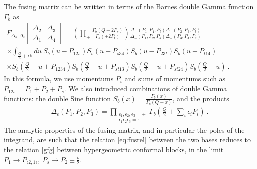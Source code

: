 \documentclass[12pt, a4paper, notitlepage, twoside]{report}
\numberwithin{equation}{section}
\theoremstyle{break}
\begin{document}
The fusing matrix can be written in terms of the Barnes double Gamma function $\Gamma_b$ as \cite{tv12} 
\begin{multline}
 F_{\Delta_s,\Delta_t}\begin{bmatrix} \Delta_2 & \Delta_3 \\ \Delta_1 & \Delta_4 \end{bmatrix} = \left(\prod_{\pm}\frac{\Gamma_b(Q\pm 2P_s)}{\Gamma_b(\pm 2P_t)}\right) \frac{\Delta_+(P_1,P_4,P_t)\Delta_+(P_2,P_3,P_t)}{\Delta_-(P_1,P_2,P_s)\Delta_-(P_3,P_4,P_s)}
 \\
 \times \int_{\frac{Q}{4}+i\mathbb{R}}du \ S_b(u-P_{12s})S_b(u-P_{s34})S_b(u-P_{23t})S_b(u-P_{t14}) \hspace{3cm}
 \\
 \times S_b(\tfrac{Q}{2}-u+P_{1234}) S_b(\tfrac{Q}{2}-u+P_{st13}) S_b(\tfrac{Q}{2}-u+P_{st24})S_b(\tfrac{Q}{2}-u) \ .
 \label{eq:fm}
\end{multline}
In this formula, we use momentums $P_i$ and sums of momentums such as $P_{12s}=P_1+P_2+P_s$. We also introduced combinations of double Gamma functions: the double Sine function $S_b(x) = \frac{\Gamma_b(x)}{\Gamma_b(Q-x)}$, and the products
\begin{align}
 \Delta_\epsilon(P_1,P_2,P_3) =\prod_{\substack{\epsilon_1,\epsilon_2,\epsilon_3=\pm \\ \epsilon_1\epsilon_2\epsilon_3=\epsilon}} \Gamma_b\left(\tfrac{Q}{2}+\textstyle{\sum}_i\epsilon_iP_i\right)\ .
\end{align}
The analytic properties of the fusing matrix, and in particular the poles of the integrand, are such that the relation \eqref{eq:fusrel} between the two bases reduces to the relation \eqref{gfg} between hypergeometric conformal blocks, in the limit $P_1\to P_{\langle 2,1\rangle},\ P_s\to P_2 \pm \frac{b}{2}$.
\end{document}
